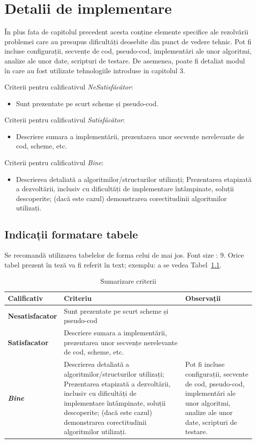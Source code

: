 \documentclass[12pt,a4paper]{report}
\begin{document}
\chapter{Detalii de implementare}
În plus fata de capitolul precedent acesta conține elemente specifice ale rezolvării problemei care au presupus dificultăți deosebite din punct de vedere tehnic. Pot fi incluse configurații, secvențe de cod, pseudo-cod, implementări ale unor algoritmi, analize ale unor date, scripturi de testare. De asemenea, poate fi detaliat modul în care au fost utilizate tehnologiile introduse in capitolul 3.


Criterii pentru calificativul \textit{Ne\textit{Satisfăcător}}:
\begin{itemize}
	\item	Sunt prezentate pe scurt scheme și pseudo-cod.
\end{itemize}
Criterii pentru calificativul \textit{Satisfăcător}:
\begin{itemize}
	\item	Descriere sumara a implementării, prezentarea unor secvențe nerelevante de cod, scheme, etc.
\end{itemize}
Criterii pentru calificativul \textit{Bine}:
\begin{itemize}
	\item	Descrierea detaliată a algoritmilor/structurilor utilizați; Prezentarea etapizată a dezvoltării, inclusiv cu dificultăți de implementare întâmpinate, soluții descoperite; (dacă este cazul) demonstrarea corectitudinii algoritmilor utilizați.
\end{itemize}

\section{Indicații formatare tabele}
Se recomandă utilizarea tabelelor de forma celui de mai jos.  Font size :  9.
Orice tabel prezent în teză va fi referit în text; exemplu: a se vedea Tabel~\ref{tab:criterii}.

\begin{table}[th]\small\linespread{1}
\caption{Sumarizare criterii}
\label{tab:criterii}
\begin{tabular}{l >{\raggedright\arraybackslash}p{8cm} >{\raggedright\arraybackslash}p{4cm}}
\textbf{Calificativ} & \textbf{Criteriu} & \textbf{Observații} \\\hline
\textbf{Nesatisfacator} & Sunt prezentate pe scurt scheme și pseudo-cod & \\\hline
\textbf{Satisfacator} &Descriere sumara a implementării, prezentarea unor secvențe nerelevante de cod, scheme, etc.& \\
\hline
\textbf{\textit{Bine}} &Descrierea detaliată a algoritmilor/structurilor utilizați; Prezentarea etapizată a dezvoltării, inclusiv cu dificultăți de implementare întâmpinate, soluții descoperite; (dacă este cazul) demonstrarea corectitudinii algoritmilor utilizați. & Pot fi incluse configurații, secvente de cod, pseudo-cod, implementări ale unor algoritmi, analize ale unor date, scripturi de testare. \\
\hline
\end{tabular}
\end{table}
\end{document}
